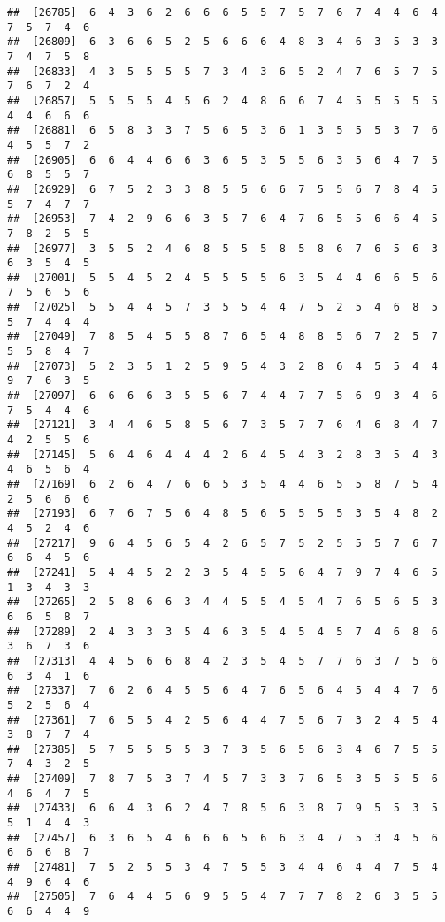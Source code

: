 \documentclass[
]{book}
\begin{document}
\begin{verbatim}
##  [26785]  6  4  3  6  2  6  6  6  5  5  7  5  7  6  7  4  4  6  4  7  5  7  4  6
##  [26809]  6  3  6  6  5  2  5  6  6  6  4  8  3  4  6  3  5  3  3  7  4  7  5  8
##  [26833]  4  3  5  5  5  5  7  3  4  3  6  5  2  4  7  6  5  7  5  7  6  7  2  4
##  [26857]  5  5  5  5  4  5  6  2  4  8  6  6  7  4  5  5  5  5  5  4  4  6  6  6
##  [26881]  6  5  8  3  3  7  5  6  5  3  6  1  3  5  5  5  3  7  6  4  5  5  7  2
##  [26905]  6  6  4  4  6  6  3  6  5  3  5  5  6  3  5  6  4  7  5  6  8  5  5  7
##  [26929]  6  7  5  2  3  3  8  5  5  6  6  7  5  5  6  7  8  4  5  5  7  4  7  7
##  [26953]  7  4  2  9  6  6  3  5  7  6  4  7  6  5  5  6  6  4  5  7  8  2  5  5
##  [26977]  3  5  5  2  4  6  8  5  5  5  8  5  8  6  7  6  5  6  3  6  3  5  4  5
##  [27001]  5  5  4  5  2  4  5  5  5  5  6  3  5  4  4  6  6  5  6  7  5  6  5  6
##  [27025]  5  5  4  4  5  7  3  5  5  4  4  7  5  2  5  4  6  8  5  5  7  4  4  4
##  [27049]  7  8  5  4  5  5  8  7  6  5  4  8  8  5  6  7  2  5  7  5  5  8  4  7
##  [27073]  5  2  3  5  1  2  5  9  5  4  3  2  8  6  4  5  5  4  4  9  7  6  3  5
##  [27097]  6  6  6  6  3  5  5  6  7  4  4  7  7  5  6  9  3  4  6  7  5  4  4  6
##  [27121]  3  4  4  6  5  8  5  6  7  3  5  7  7  6  4  6  8  4  7  4  2  5  5  6
##  [27145]  5  6  4  6  4  4  4  2  6  4  5  4  3  2  8  3  5  4  3  4  6  5  6  4
##  [27169]  6  2  6  4  7  6  6  5  3  5  4  4  6  5  5  8  7  5  4  2  5  6  6  6
##  [27193]  6  7  6  7  5  6  4  8  5  6  5  5  5  5  3  5  4  8  2  4  5  2  4  6
##  [27217]  9  6  4  5  6  5  4  2  6  5  7  5  2  5  5  5  7  6  7  6  6  4  5  6
##  [27241]  5  4  4  5  2  2  3  5  4  5  5  6  4  7  9  7  4  6  5  1  3  4  3  3
##  [27265]  2  5  8  6  6  3  4  4  5  5  4  5  4  7  6  5  6  5  3  6  6  5  8  7
##  [27289]  2  4  3  3  3  5  4  6  3  5  4  5  4  5  7  4  6  8  6  3  6  7  3  6
##  [27313]  4  4  5  6  6  8  4  2  3  5  4  5  7  7  6  3  7  5  6  6  3  4  1  6
##  [27337]  7  6  2  6  4  5  5  6  4  7  6  5  6  4  5  4  4  7  6  5  2  5  6  4
##  [27361]  7  6  5  5  4  2  5  6  4  4  7  5  6  7  3  2  4  5  4  3  8  7  7  4
##  [27385]  5  7  5  5  5  5  3  7  3  5  6  5  6  3  4  6  7  5  5  7  4  3  2  5
##  [27409]  7  8  7  5  3  7  4  5  7  3  3  7  6  5  3  5  5  5  6  4  6  4  7  5
##  [27433]  6  6  4  3  6  2  4  7  8  5  6  3  8  7  9  5  5  3  5  5  1  4  4  3
##  [27457]  6  3  6  5  4  6  6  6  5  6  6  3  4  7  5  3  4  5  6  6  6  6  8  7
##  [27481]  7  5  2  5  5  3  4  7  5  5  3  4  4  6  4  4  7  5  4  4  9  6  4  6
##  [27505]  7  6  4  4  5  6  9  5  5  4  7  7  7  8  2  6  3  5  5  6  6  4  4  9

\end{verbatim}
\end{document}
